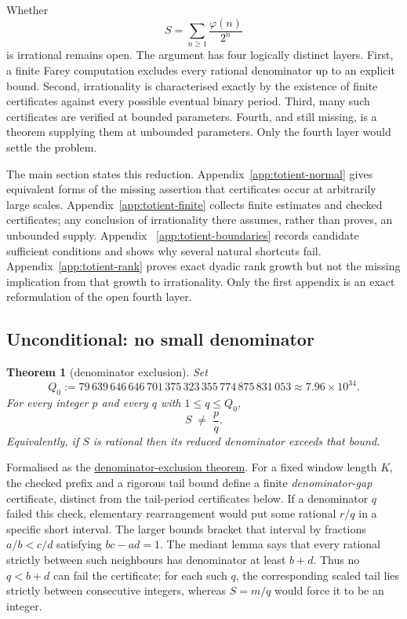 \documentclass[11pt]{article}
\newcommand{\commit}{312b96c0d149ed466725c62d4ef24cfc91bca34e}
\newcommand{\repobase}{https://github.com/wcook04/plectis-lean-erdos249-257/blob/\commit}
\newcommand{\PK}{Erdos249257}
\newcommand{\lword}[4]{\href{\repobase/\PK/#1\#L#2}{#4}}
\newtheorem{theorem}{Theorem}[section]
\theoremstyle{definition}
\theoremstyle{remark}
\newcommand{\ph}{\varphi}
\newcommand{\Qzero}{Q_0}
\begin{document}
Whether
\[
S=\sum_{n\ge1}\frac{\ph(n)}{2^n}
\]
is irrational remains open.  The argument has four logically distinct
layers.  First, a finite Farey computation excludes every rational
denominator up to an explicit bound.  Second, irrationality is characterised
exactly by the existence of finite certificates against every possible
eventual binary period.  Third, many such certificates are verified at
bounded parameters.  Fourth, and still missing, is a theorem supplying them
at unbounded parameters.  Only the fourth layer would settle the problem.

The main section states this reduction.  Appendix~\ref{app:totient-normal}
gives equivalent forms of the missing assertion that certificates occur at
arbitrarily large scales.  Appendix~\ref{app:totient-finite} collects finite
estimates and checked certificates; any conclusion of irrationality there
assumes, rather than proves, an unbounded supply.  Appendix~
\ref{app:totient-boundaries} records candidate sufficient conditions and
shows why several natural shortcuts fail.  Appendix~\ref{app:totient-rank}
proves exact dyadic rank growth but not the missing implication from that
growth to irrationality.  Only the first appendix is an exact reformulation
of the open fourth layer.

\subsection{Unconditional: no small denominator}\label{sec:uncond}

\begin{theorem}[denominator exclusion]\label{res:farey}
Set
\[
\Qzero:=79\,639\,646\,646\,701\,375\,323\,355\,774\,875\,831\,053
       \approx7.96\times10^{34}.
\]
For every integer $p$ and every $q$ with $1\le q\le\Qzero$,
\[
S \;\ne\; \frac{p}{q}.
\]
Equivalently, if $S$ is rational then its reduced denominator exceeds that bound.
\end{theorem}
\noindent Formalised as the
\lword{CertificateKernel.lean}{18056}{tsum_totient_div_pow_two_ne_ratCast_of_den_le_79639646646701375323355774875831053}{denominator-exclusion theorem}.
For a fixed window length $K$, the checked prefix and a rigorous tail bound
define a finite \emph{denominator-gap} certificate, distinct from the
tail-period certificates below.  If a denominator $q$ failed this check,
elementary rearrangement would put some rational $r/q$ in a specific short
interval.  The larger bounds bracket that interval by fractions
$a/b<c/d$ satisfying $bc-ad=1$.  The mediant lemma says that every rational
strictly between such neighbours has denominator at least $b+d$.  Thus no
$q<b+d$ can fail the certificate; for each such $q$, the corresponding scaled
tail lies strictly between consecutive integers, whereas $S=m/q$ would force it
to be an integer.
\end{document}
